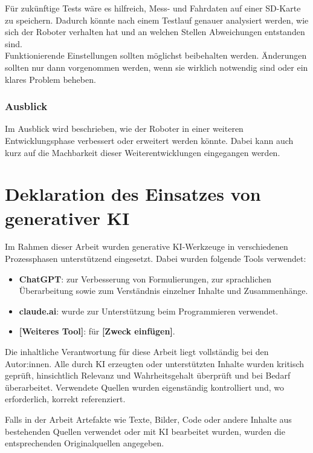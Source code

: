 \documentclass[11pt,a4paper]{article}
\begin{document}
	\noindent
	Für zukünftige Tests wäre es hilfreich, Mess- und Fahrdaten auf einer SD-Karte zu speichern. Dadurch könnte nach einem Testlauf genauer analysiert werden, wie sich der Roboter verhalten hat und an welchen Stellen Abweichungen entstanden sind.\\
	
	\noindent
	Funktionierende Einstellungen sollten möglichst beibehalten werden. Änderungen sollten nur dann vorgenommen werden, wenn sie wirklich notwendig sind oder ein klares Problem beheben. \\
		
	\subsubsection{Ausblick}
	
	Im Ausblick wird beschrieben, wie der Roboter in einer weiteren Entwicklungsphase verbessert oder erweitert werden könnte. Dabei kann auch kurz auf die Machbarkeit dieser Weiterentwicklungen eingegangen werden.
	
	


\newpage
	\nocite{*} %
	\printbibliography[
	heading=bibnumbered,
	title={Literaturverzeichnis}
	]
	
		\section*{Deklaration des Einsatzes von generativer KI}
	\begin{minipage}[t]{\textwidth}
		Im Rahmen dieser Arbeit wurden generative KI-Werkzeuge in verschiedenen Prozessphasen unterstützend eingesetzt. Dabei wurden folgende Tools verwendet:
		
		\begin{itemize}
			\item \textbf{ChatGPT}: zur Verbesserung von Formulierungen, zur sprachlichen Überarbeitung sowie zum Verständnis einzelner Inhalte und Zusammenhänge.
			\item \textbf{claude.ai}: wurde zur Unterstützung beim Programmieren verwendet.
			\item \textbf{[Weiteres Tool]}: für \textbf{[Zweck einfügen]}.
		\end{itemize}
		
		Die inhaltliche Verantwortung für diese Arbeit liegt vollständig bei den Autor:innen. Alle durch KI erzeugten oder unterstützten Inhalte wurden kritisch geprüft, hinsichtlich Relevanz und Wahrheitsgehalt überprüft und bei Bedarf überarbeitet. Verwendete Quellen wurden eigenständig kontrolliert und, wo erforderlich, korrekt referenziert.
		
		Falls in der Arbeit Artefakte wie Texte, Bilder, Code oder andere Inhalte aus bestehenden Quellen verwendet oder mit KI bearbeitet wurden, wurden die entsprechenden Originalquellen angegeben.
	\end{minipage}
	
\end{document}
